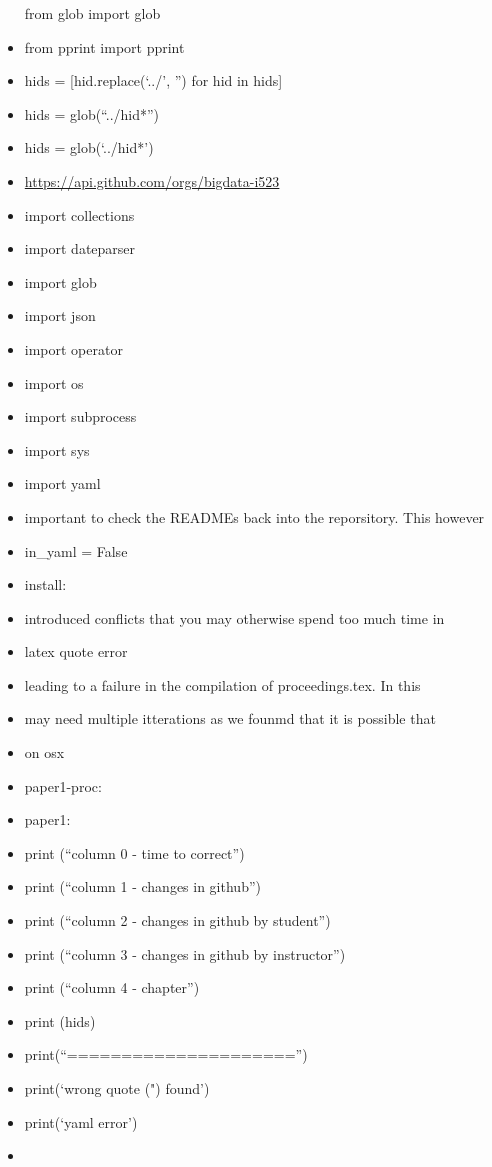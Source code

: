\begin{itemize}
  from glob import glob
\item
  from pprint import pprint
\item
  hids = {[}hid.replace(`../', '') for hid in hids{]}
\item
  hids = glob(``../hid*'')
\item
  hids = glob(`../hid*')
\item
  \url{https://api.github.com/orgs/bigdata-i523}
\item
  import collections
\item
  import dateparser
\item
  import glob
\item
  import json
\item
  import operator
\item
  import os
\item
  import subprocess
\item
  import sys
\item
  import yaml
\item
  important to check the READMEs back into the reporsitory. This however
\item
  in\_yaml = False
\item
  install:
\item
  introduced conflicts that you may otherwise spend too much time in
\item
  latex quote error
\item
  leading to a failure in the compilation of proceedings.tex. In this
\item
  may need multiple itterations as we founmd that it is possible that
\item
  on osx
\item
  paper1-proc:
\item
  paper1:
\item
  print (``column 0 - time to correct'')
\item
  print (``column 1 - changes in github'')
\item
  print (``column 2 - changes in github by student'')
\item
  print (``column 3 - changes in github by instructor'')
\item
  print (``column 4 - chapter'')
\item
  print (hids)
\item
  print(``====================='')
\item
  print(`wrong quote (") found')
\item
  print(`yaml error')
\item

\end{itemize}
